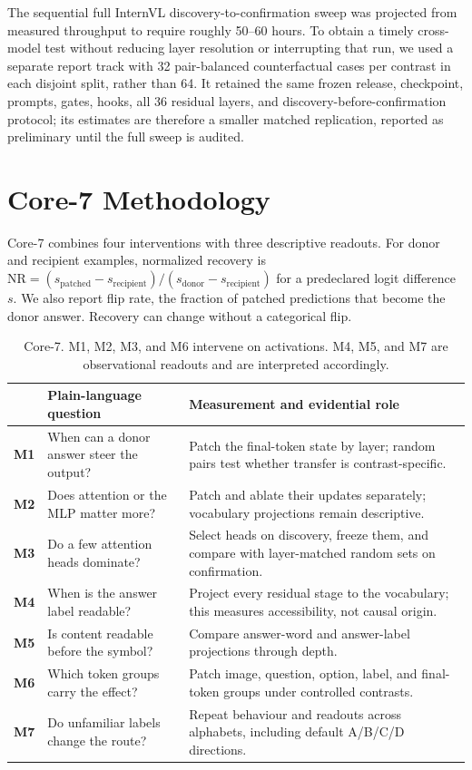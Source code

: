 \documentclass[11pt]{article}
\newcommand{\method}[1]{\textbf{M#1}}
\newcommand{\nr}{\mathrm{NR}}
\begin{document}
The sequential full InternVL discovery-to-confirmation sweep was projected
from measured throughput to require roughly 50--60 hours. To obtain a timely
cross-model test without reducing layer resolution or interrupting that run,
we used a separate report track with 32 pair-balanced counterfactual cases per
contrast in each disjoint split, rather than 64. It retained the same frozen
release, checkpoint, prompts, gates, hooks, all 36 residual layers, and
discovery-before-confirmation protocol; its estimates are therefore a smaller
matched replication, reported as preliminary until the full sweep is audited.

\section{Core-7 Methodology}

Core-7 combines four interventions with three descriptive readouts. For donor
and recipient examples, normalized recovery is
$\nr=(s_{\mathrm{patched}}-s_{\mathrm{recipient}})/
(s_{\mathrm{donor}}-s_{\mathrm{recipient}})$ for a predeclared logit
difference $s$. We also report flip rate, the fraction of patched predictions
that become the donor answer. Recovery can change without a categorical flip.

\begin{table}[t]
\centering
\begin{tabularx}{\textwidth}{@{}l p{} X@{}}
\toprule
 & Plain-language question & Measurement and evidential role \\
\midrule
\method{1} & When can a donor answer steer the output? & Patch the final-token
state by layer; random pairs test whether transfer is contrast-specific. \\
\method{2} & Does attention or the MLP matter more? & Patch and ablate their
updates separately; vocabulary projections remain descriptive. \\
\method{3} & Do a few attention heads dominate? & Select heads on discovery,
freeze them, and compare with layer-matched random sets on confirmation. \\
\method{4} & When is the answer label readable? & Project every residual stage
to the vocabulary; this measures accessibility, not causal origin. \\
\method{5} & Is content readable before the symbol? & Compare answer-word and
answer-label projections through depth. \\
\method{6} & Which token groups carry the effect? & Patch image, question,
option, label, and final-token groups under controlled contrasts. \\
\method{7} & Do unfamiliar labels change the route? & Repeat behaviour and
readouts across alphabets, including default A/B/C/D directions. \\
\bottomrule
\end{tabularx}
\caption{Core-7. M1, M2, M3, and M6 intervene on activations. M4, M5, and M7
are observational readouts and are interpreted accordingly.}
\label{tab:core7}
\end{table}
\end{document}
